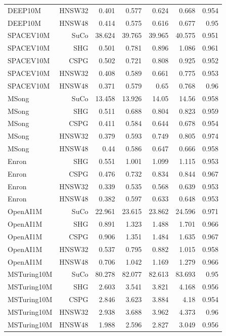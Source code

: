 \begin{table}[t]
\begin{tabular}{lrrrrrr}
DEEP10M & HNSW32 & 0.401 & 0.577 & 0.624 & 0.668 & 0.954 \\
DEEP10M & HNSW48 & 0.414 & 0.575 & 0.616 & 0.677 & 0.95 \\
SPACEV10M & SuCo & 38.624 & 39.765 & 39.965 & 40.575 & 0.951 \\
SPACEV10M & SHG & 0.501 & 0.781 & 0.896 & 1.086 & 0.961 \\
SPACEV10M & CSPG & 0.502 & 0.721 & 0.808 & 0.925 & 0.952 \\
SPACEV10M & HNSW32 & 0.408 & 0.589 & 0.661 & 0.775 & 0.953 \\
SPACEV10M & HNSW48 & 0.371 & 0.579 & 0.65 & 0.768 & 0.96 \\
MSong & SuCo & 13.458 & 13.926 & 14.05 & 14.56 & 0.958 \\
MSong & SHG & 0.511 & 0.688 & 0.804 & 0.823 & 0.959 \\
MSong & CSPG & 0.411 & 0.584 & 0.644 & 0.678 & 0.954 \\
MSong & HNSW32 & 0.379 & 0.593 & 0.749 & 0.805 & 0.974 \\
MSong & HNSW48 & 0.44 & 0.586 & 0.647 & 0.666 & 0.958 \\
Enron & SHG & 0.551 & 1.001 & 1.099 & 1.115 & 0.953 \\
Enron & CSPG & 0.476 & 0.732 & 0.834 & 0.844 & 0.967 \\
Enron & HNSW32 & 0.339 & 0.535 & 0.568 & 0.639 & 0.953 \\
Enron & HNSW48 & 0.382 & 0.597 & 0.633 & 0.648 & 0.953 \\
OpenAI1M & SuCo & 22.961 & 23.615 & 23.862 & 24.596 & 0.971 \\
OpenAI1M & SHG & 0.891 & 1.323 & 1.488 & 1.701 & 0.966 \\
OpenAI1M & CSPG & 0.906 & 1.351 & 1.484 & 1.635 & 0.967 \\
OpenAI1M & HNSW32 & 0.537 & 0.795 & 0.882 & 1.015 & 0.958 \\
OpenAI1M & HNSW48 & 0.706 & 1.042 & 1.169 & 1.279 & 0.966 \\
MSTuring10M & SuCo & 80.278 & 82.077 & 82.613 & 83.693 & 0.95 \\
MSTuring10M & SHG & 2.603 & 3.541 & 3.821 & 4.168 & 0.956 \\
MSTuring10M & CSPG & 2.846 & 3.623 & 3.884 & 4.18 & 0.954 \\
MSTuring10M & HNSW32 & 2.938 & 3.688 & 3.962 & 4.373 & 0.96 \\
MSTuring10M & HNSW48 & 1.988 & 2.596 & 2.827 & 3.049 & 0.956 \\
\bottomrule
\end{tabular}
\end{table}
